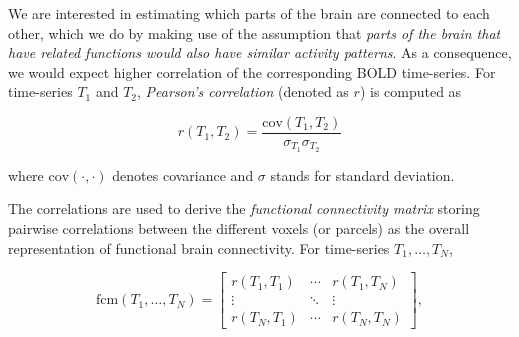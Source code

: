 We are interested in estimating which parts of the brain are connected to each other, which we do by making use of the assumption that \textit{parts of the brain that have related functions would also have similar activity patterns}. As a consequence, we would expect higher correlation of the corresponding BOLD time-series. For time-series $T_1$ and $T_2$, \textit{Pearson's correlation} (denoted as $r$) is computed as

\begin{equation}
    r(T_1, T_2) = \frac{\mathrm{cov}(T_1, T_2)}{\sigma_{T_1} \sigma_{T_2}}
\end{equation}

where $\mathrm{cov}(\cdot, \cdot)$ denotes covariance and $\sigma$ stands for standard deviation.



The correlations are used to derive the \textit{functional connectivity matrix} storing pairwise correlations between the different voxels (or parcels) as the overall representation of functional brain connectivity. For time-series $T_1, \dots, T_N$,

\begin{equation}
    \mathrm{fcm}(T_1, \dots, T_N) = \begin{bmatrix}
        r(T_1, T_1) & \cdots & r(T_1, T_N) \\
        \vdots & \ddots & \vdots \\
        r(T_N, T_1) & \cdots & r(T_N, T_N)
    \end{bmatrix},
\end{equation}

